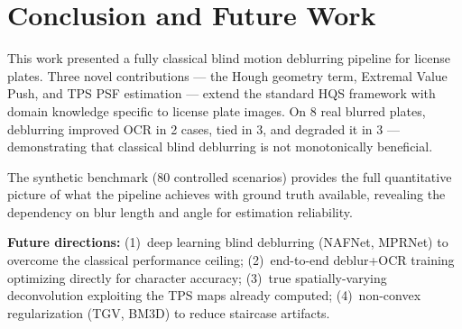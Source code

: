 \documentclass[12pt,a4paper]{article}
\begin{document}
\section{Conclusion and Future Work}

This work presented a fully classical blind motion deblurring pipeline for license plates.
Three novel contributions --- the Hough geometry term, Extremal Value Push, and TPS PSF
estimation --- extend the standard HQS framework with domain knowledge specific to
license plate images. On 8 real blurred plates, deblurring improved OCR in 2 cases,
tied in 3, and degraded it in 3 --- demonstrating that classical blind deblurring is
not monotonically beneficial.

The synthetic benchmark (80 controlled scenarios) provides the full quantitative picture
of what the pipeline achieves with ground truth available, revealing the dependency on
blur length and angle for estimation reliability.

\textbf{Future directions:}
(1)~deep learning blind deblurring (NAFNet, MPRNet) to overcome the classical performance ceiling;
(2)~end-to-end deblur+OCR training optimizing directly for character accuracy;
(3)~true spatially-varying deconvolution exploiting the TPS maps already computed;
(4)~non-convex regularization (TGV, BM3D) to reduce staircase artifacts.

\end{document}
